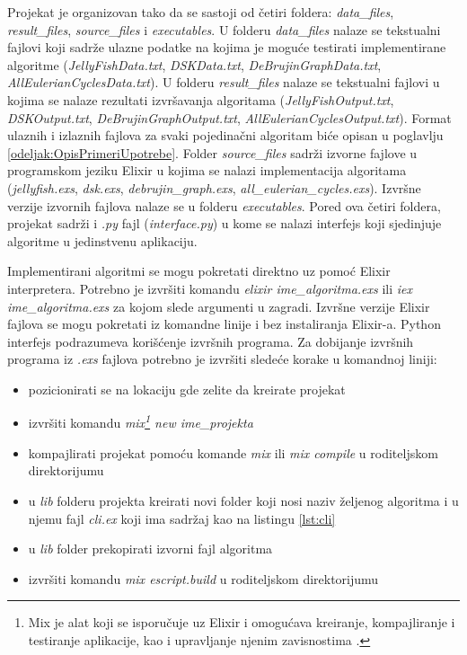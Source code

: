 \documentclass[12pt,oneside]{memoir}
\begin{document}
Projekat je organizovan tako da se sastoji od četiri foldera: \textit{data\_files}, \textit{result\_files}, \textit{source\_files} i \textit{executables}. U folderu \textit{data\_files} nalaze se tekstualni fajlovi koji sadrže ulazne podatke na kojima je moguće testirati implementirane algoritme (\textit{JellyFishData.txt}, \textit{DSKData.txt}, \textit{DeBrujinGraphData.txt}, \textit{AllEulerianCyclesData.txt}). U folderu \textit{result\_files} nalaze se tekstualni fajlovi u kojima se nalaze rezultati izvršavanja algoritama (\textit{JellyFishOutput.txt}, \textit{DSKOutput.txt}, \textit{DeBrujinGraphOutput.txt}, \textit{AllEulerianCyclesOutput.txt}). Format ulaznih i izlaznih fajlova za svaki pojedinačni algoritam biće opisan u poglavlju \ref{odeljak:OpisPrimeriUpotrebe}. Folder \textit{source\_files} sadrži izvorne fajlove u programskom jeziku Elixir u kojima se nalazi implementacija algoritama (\textit{jellyfish.exs}, \textit{dsk.exs}, \textit{debrujin\_graph.exs}, \textit{all\_eulerian\_cycles.exs}). Izvršne verzije izvornih fajlova nalaze se u folderu \textit{executables}. Pored ova četiri foldera, projekat sadrži i \textit{.py} fajl (\textit{interface.py}) u kome se nalazi interfejs koji sjedinjuje algoritme u jedinstvenu aplikaciju.

Implementirani algoritmi se mogu pokretati direktno uz pomoć Elixir interpretera. Potrebno je izvršiti komandu \textit{elixir ime\_algoritma.exs} ili \textit{iex ime\_algoritma.exs} za kojom slede argumenti u zagradi. Izvršne verzije Elixir fajlova se mogu pokretati iz komandne linije i bez instaliranja Elixir-a. Python interfejs podrazumeva korišćenje izvršnih programa. Za dobijanje izvršnih programa iz \textit{.exs} fajlova potrebno je izvršiti sledeće korake u komandnoj liniji:

\begin{itemize}
\itemsep0em 
    \item {pozicionirati se na lokaciju gde zelite da kreirate projekat}
     \item {izvršiti komandu \textit{mix\footnote{Mix je alat koji se isporučuje uz Elixir i omogućava kreiranje, kompajliranje i testiranje aplikacije, kao i upravljanje njenim zavisnostima \cite{Mix}.} new ime\_projekta}}
     \item {kompajlirati projekat pomoću komande \textit{mix} ili \textit{mix compile} u roditeljskom direktorijumu}
     \item {u \textit{lib} folderu projekta kreirati novi folder koji nosi naziv željenog algoritma i u njemu fajl \textit{cli.ex} koji ima sadržaj kao na listingu \ref{lst:cli}}
     \item {u \textit{lib} folder prekopirati izvorni fajl algoritma}
     \item {izvršiti komandu \textit{mix escript.build} u roditeljskom direktorijumu}
\end{itemize}
\end{document}
